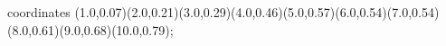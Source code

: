 					coordinates { (1.0,0.07)(2.0,0.21)(3.0,0.29)(4.0,0.46)(5.0,0.57)(6.0,0.54)(7.0,0.54)(8.0,0.61)(9.0,0.68)(10.0,0.79)};